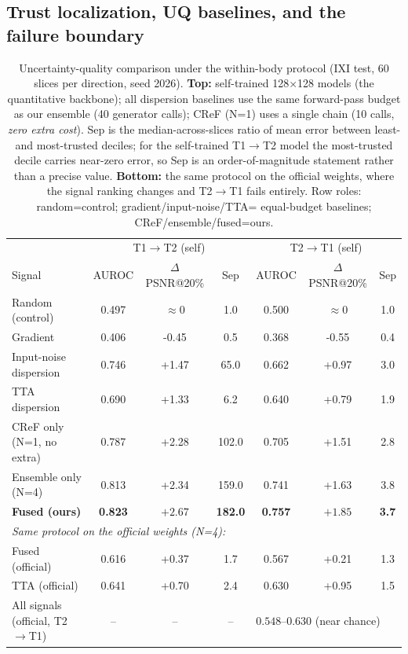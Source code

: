 \documentclass[11pt]{article}
\begin{document}
\subsection{Trust localization, UQ baselines, and the failure boundary}
\label{sec:exp-uq}
\begin{table}[t]
\centering\small
\caption{Uncertainty-quality comparison under the within-body protocol
(IXI test, 60 slices per direction, seed 2026). \textbf{Top:} self-trained
128$\times$128 models (the quantitative backbone); all dispersion baselines
use the same forward-pass budget as our ensemble (40 generator calls); CReF
(N=1) uses a single chain (10 calls, \emph{zero extra cost}). Sep is the
median-across-slices ratio of mean error between least- and most-trusted
deciles; for the self-trained T1$\to$T2 model the most-trusted decile carries
near-zero error, so Sep is an order-of-magnitude statement rather than a
precise value. \textbf{Bottom:} the same protocol on the official weights,
where the signal ranking changes and T2$\to$T1 fails entirely.
Row roles: random=control; gradient/input-noise/TTA=
equal-budget baselines; CReF/ensemble/fused=ours.}
\label{tab:uq}
\begin{tabular}{lcccccc}
\toprule
 & \multicolumn{3}{c}{T1$\to$T2 (self)} & \multicolumn{3}{c}{T2$\to$T1 (self)} \\
Signal & AUROC & $\Delta$PSNR@20\% & Sep & AUROC & $\Delta$PSNR@20\% & Sep \\
\midrule
Random (control) & 0.497 & $\approx$0 & 1.0 & 0.500 & $\approx$0 & 1.0 \\
Gradient & 0.406 & -0.45 & 0.5 & 0.368 & -0.55 & 0.4 \\
Input-noise dispersion & 0.746 & +1.47 & 65.0 & 0.662 & +0.97 & 3.0 \\
TTA dispersion & 0.690 & +1.33 & 6.2 & 0.640 & +0.79 & 1.9 \\
CReF only (N=1, no extra) & 0.787 & +2.28 & 102.0 & 0.705 & +1.51 & 2.8 \\
Ensemble only (N=4) & 0.813 & +2.34 & 159.0 & 0.741 & +1.63 & 3.8 \\
\textbf{Fused (ours)} & \textbf{0.823} & $\mathbf{+2.67}$ & \textbf{182.0} & \textbf{0.757} & $\mathbf{+1.85}$ & \textbf{3.7} \\
\midrule
\multicolumn{7}{l}{\emph{Same protocol on the official weights (N=4):}} \\
Fused (official) & 0.616 & +0.37 & 1.7 & 0.567 & +0.21 & 1.3 \\
TTA (official) & 0.641 & +0.70 & 2.4 & 0.630 & +0.95 & 1.5 \\
All signals (official, T2$\to$T1) & -- & -- & -- & \multicolumn{3}{l}{$0.548$--$0.630$ (near chance)} \\
\bottomrule
\end{tabular}
\end{table}
\end{document}

